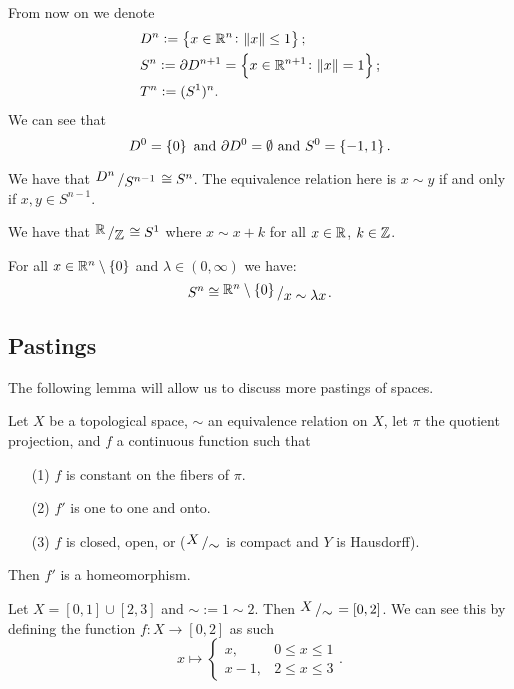 \documentclass[11pt,a4paper]{article}
\begin{document}
From now on we denote
\begin{align*}
  &D^n := \set{x \in \mathbb{R}^n \colon \norm{x} \le 1}; \\
  &S^n := \partial D^{n+1} = \set{x \in \mathbb{R}^{n+1} \colon \norm{x} = 1}; \\
  &T^n := (S^1)^n.
\end{align*}
We can see that
\[
  D^0 = \set{0} \text{ and } \partial D^0 = \emptyset \text{ and } S^0 = \set{-1, 1}.
\]

\begin{example}
  We have that $\bigslant{D^n}{S^{n-1}} \cong S^n$.
  The equivalence relation here is $x \sim y$ if and only if $x,y \in S^{n-1}$.
\end{example}
\begin{example}
  We have that $\bigslant{\R}{\Z} \cong S^1$ where $x \sim x + k$ for all
  $x \in \mathbb{R}$, $k \in \mathbb{Z}$.
\end{example}
\begin{example}
  For all $x \in \mathbb{R}^n \setminus \set{0}$ and $\lambda \in (0,\infty)$ we
  have:
  \[
    S^n \cong \bigslant{\R^n \setminus \set{0}}{x \sim \lambda x}.
  \]
\end{example}

\subsection{Pastings}

The following lemma will allow us to discuss more pastings of spaces.

\begin{lemma}
  Let $X$ be a topological space, $\sim$ an equivalence relation on $X$,
  let $\pi$ the quotient projection, and $f$ a continuous function such that
  \begin{enumerate}
    \item[(1)] $f$ is constant on the fibers of $\pi$.
    \item[(2)] $f'$ is one to one and onto.
    \item[(3)] $f$ is closed, open, or ($\bigslant{X}{\sim}$ is compact and
      $Y$ is Hausdorff).
  \end{enumerate}
  Then $f'$ is a homeomorphism.
\end{lemma}

\begin{example}
  Let $X = [0,1] \cup [2,3]$ and $\sim := 1 \sim 2$.
  Then $\bigslant{X}{\sim} = [0,2]$.
  We can see this by defining the function $f \colon X \to [0,2]$ as such
  \[
    x \mapsto
    \begin{cases}
      x, & 0 \le x \le 1 \\
      x - 1, & 2 \le x \le 3
    \end{cases}.
  \]
\end{example}
\end{document}

